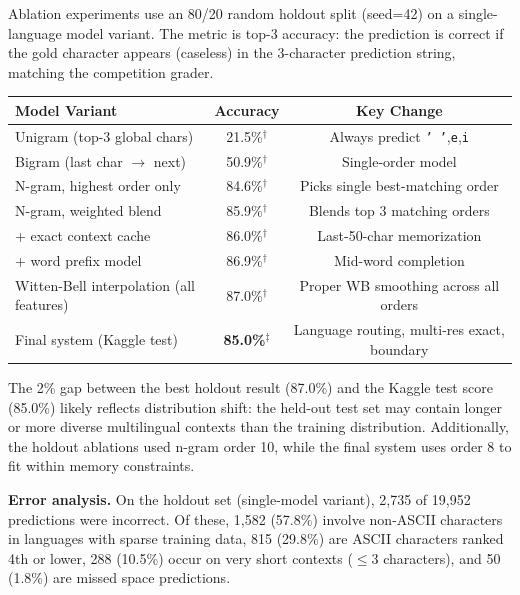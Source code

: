 \documentclass[11pt]{article}
\begin{document}
Ablation experiments use an 80/20 random holdout split (seed=42) on a single-language model variant. The metric is top-3 accuracy: the prediction is correct if the gold character appears (caseless) in the 3-character prediction string, matching the competition grader.

\begin{table}[h]
\centering
\small
\begin{tabular}{lcc}
\toprule
\textbf{Model Variant} & \textbf{Accuracy} & \textbf{Key Change} \\
\midrule
Unigram (top-3 global chars) & 21.5\%$^\dagger$ & Always predict \texttt{' '},\texttt{e},\texttt{i} \\
Bigram (last char $\to$ next) & 50.9\%$^\dagger$ & Single-order model \\
N-gram, highest order only & 84.6\%$^\dagger$ & Picks single best-matching order \\
N-gram, weighted blend & 85.9\%$^\dagger$ & Blends top 3 matching orders \\
\quad + exact context cache & 86.0\%$^\dagger$ & Last-50-char memorization \\
\quad + word prefix model & 86.9\%$^\dagger$ & Mid-word completion \\
Witten-Bell interpolation (all features) & 87.0\%$^\dagger$ & Proper WB smoothing across all orders \\
\midrule
Final system (Kaggle test) & \textbf{85.0\%}$^\ddagger$ & Language routing, multi-res exact, boundary \\
\bottomrule
\end{tabular}
\end{table}


\vspace{2pt}
\noindent The 2\% gap between the best holdout result (87.0\%) and the Kaggle test score (85.0\%) likely reflects distribution shift: the held-out test set may contain longer or more diverse multilingual contexts than the training distribution. Additionally, the holdout ablations used n-gram order 10, while the final system uses order 8 to fit within memory constraints.

\textbf{Error analysis.}
On the holdout set (single-model variant), 2,735 of 19,952 predictions were incorrect. Of these, 1,582 (57.8\%) involve non-ASCII characters in languages with sparse training data, 815 (29.8\%) are ASCII characters ranked 4th or lower, 288 (10.5\%) occur on very short contexts ($\leq$3 characters), and 50 (1.8\%) are missed space predictions.
\end{document}
